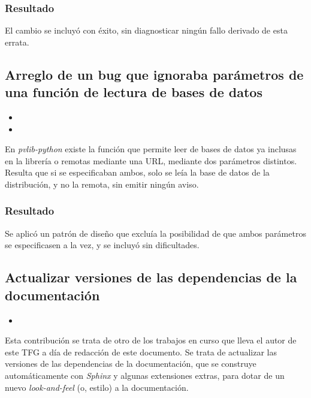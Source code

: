 \subsubsection{Resultado}

El cambio se incluyó con éxito, sin diagnosticar ningún fallo derivado de esta errata.

\subsection{Arreglo de un bug que ignoraba parámetros de una función de lectura de bases de datos}

\begin{itemize}
    \item {}
    \item {}
\end{itemize}

En \textit{pvlib-python} existe la función  que permite leer de bases de datos ya inclusas en la librería o remotas mediante una URL, mediante dos parámetros distintos. Resulta que si se especificaban ambos, solo se leía la base de datos de la distribución, y no la remota, sin emitir ningún aviso.

\subsubsection{Resultado}

Se aplicó un patrón de diseño que excluía la posibilidad de que ambos parámetros se especificasen a la vez, y se incluyó sin dificultades.

\subsection{Actualizar versiones de las dependencias de la documentación}

\begin{itemize}
    \item {}
\end{itemize}

Esta contribución se trata de otro de los trabajos en curso que lleva el autor de este TFG a día de redacción de este documento. Se trata de actualizar las versiones de las dependencias de la documentación, que se construye automáticamente con \textit{Sphinx} y algunas extensiones extras, para dotar de un nuevo \textit{look-and-feel} (o, estilo) a la documentación.

